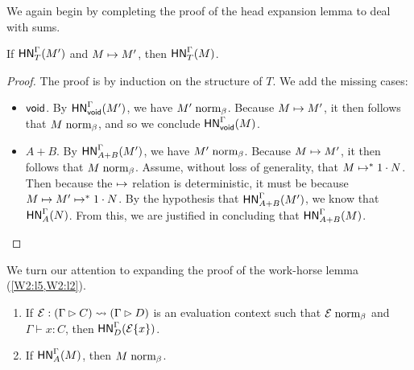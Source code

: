 \documentclass{article}
\begin{document}
We again begin by completing the proof of the head expansion lemma to deal with sums.

\begin{lemma}
  \label{lemma:open-hexp-sums}
  If $\mathsf{HN}^{\Gamma}_{T}(M')$ and $M \mapsto M'$, then $\mathsf{HN}^{\Gamma}_{T}(M)$.
\end{lemma}

\begin{proof}
  The proof is by induction on the structure of $T$.
  We add the missing cases:
  \begin{itemize}
  \item $\mathsf{void}$. By $\mathsf{HN}^{\Gamma}_{\mathsf{void}}(M')$, we have $M' \mathrel{\text{norm}_\beta}$.
    Because $M \mapsto M'$, it then follows that $M \mathrel{\text{norm}_\beta}$, and so we conclude $\mathsf{HN}^{\Gamma}_{\mathsf{void}}(M)$.
  \item $A + B$. By $\mathsf{HN}^{\Gamma}_{A + B}(M')$, we have $M' \mathrel{\text{norm}_\beta}$.
    Because $M \mapsto M'$, it then follows that $M \mathrel{\text{norm}_\beta}$.
    Assume, without loss of generality, that $M \mapsto^* 1\cdot N$.
    Then because the $ \mapsto $ relation is deterministic, it must be because $M \mapsto M' \mapsto^* 1\cdot N$.
    By the hypothesis that $\mathsf{HN}^{\Gamma}_{A+B}(M')$, we know that $\mathsf{HN}^{\Gamma}_{A}(N)$.
    From this, we are justified in concluding that $\mathsf{HN}^{\Gamma}_{A+B}(M)$.\qedhere
  \end{itemize}
\end{proof}

We turn our attention to expanding the proof of the work-horse lemma (\cref{W2:l5,W2:l2}).

\begin{lemma}\leavevmode
  \label{lemma:open-work-horse}
  \begin{enumerate}
  \item If $\mathcal{E} : (\Gamma \rhd C) \leadsto (\Gamma \rhd D)$ is an evaluation context such that $\mathcal{E} \mathrel{\text{norm}_\beta}$ and $\Gamma \vdash x:C$, then $\mathsf{HN}^{\Gamma}_{D}(\mathcal{E}\{x\})$.
  \item If $\mathsf{HN}^{\Gamma}_{A}(M)$, then $M \mathrel{\text{norm}_\beta}$.
  \end{enumerate}
\end{lemma}
\end{document}
